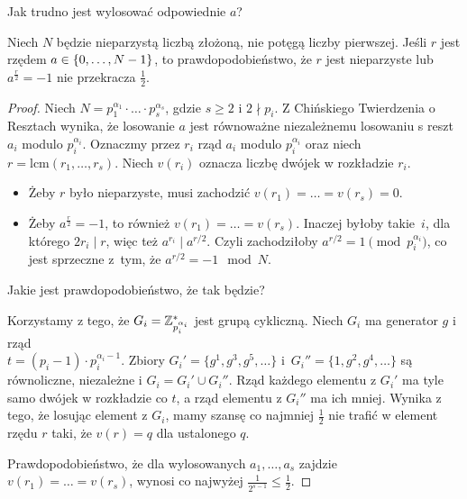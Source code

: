Jak trudno jest wylosować odpowiednie \( a \)?
\begin{theorem}
	Niech \( N \) będzie nieparzystą liczbą złożoną, nie potęgą liczby pierwszej. Jeśli \( r \) jest rzędem \( a \in \set{0, \ldots, N-1} \), to prawdopodobieństwo,
	że \( r \) jest nieparzyste lub \( a^{\frac{r}{2}} = -1 \) nie przekracza \( \frac{1}{2} \).
\end{theorem}
\begin{proof}
	Niech \( N = p_1^{\alpha_1} \cdot \ldots \cdot p_s^{\alpha_s} \), gdzie \(s \geq 2\) i \( 2 \nmid p_i \).
	Z Chińskiego Twierdzenia o Resztach wynika, że losowanie \(a\) jest równoważne niezależnemu losowaniu s reszt \(a_i\) modulo \(p_i^{\alpha_i}\).
	Oznaczmy przez \(r_i\) rząd \(a_i\) modulo \(p_i^{\alpha_i}\) oraz niech \(r = \text{lcm}(r_1, \ldots, r_s)\). Niech \(v(r_i)\) oznacza liczbę dwójek w rozkładzie \(r_i\).

	\begin{itemize}
		\item Żeby \( r \) było nieparzyste, musi zachodzić \( v(r_1) = \ldots = v(r_s) = 0 \).
		\item Żeby \( a^{\frac{r}{2}} = -1 \), to również \( v(r_1) = \ldots = v(r_s) \). Inaczej byłoby takie~\( i \), dla którego \(2r_i \mid r\), więc też \(a^{r_i} \mid a^{r/2}\).
		      Czyli zachodziłoby \(a^{r/2} = 1 \pmod{p_i^{\alpha_i}}\), co jest sprzeczne z~tym, że \(a^{r/2} = -1 \mod N\).
	\end{itemize}

	\newpage
	Jakie jest prawdopodobieństwo, że tak będzie?

	Korzystamy z tego, że \(G_i = \mathbb{Z}_{p_i^{\alpha_i}}^*\) jest grupą cykliczną. Niech \( G_i \) ma generator \(g\) i rząd \\ \( t = (p_i - 1) \cdot p_i^{\alpha_i-1} \). Zbiory \(G_i' = \{g^1, g^3, g^5, \ldots\}\) i~\(G_i'' = \{1, g^2, g^4, \ldots\}\) są równoliczne, niezależne i \(G_i = G_i' \cup G_i''\).
	Rząd każdego elementu z \(G_i'\) ma tyle samo dwójek w rozkładzie co \(t\), a rząd elementu z \(G_i''\) ma ich mniej. Wynika z tego, że losując element z \(G_i\), mamy szansę co najmniej \(\frac{1}{2}\) nie trafić w element rzędu \( r \) taki, że \(v(r) = q\) dla ustalonego \(q\).

	Prawdopodobieństwo, że dla wylosowanych \(a_1, \ldots, a_s\) zajdzie \(v(r_1) = \ldots = v(r_s)\), wynosi co najwyżej \(\frac{1}{2^{s-1}} \leq \frac{1}{2}\).
\end{proof}
